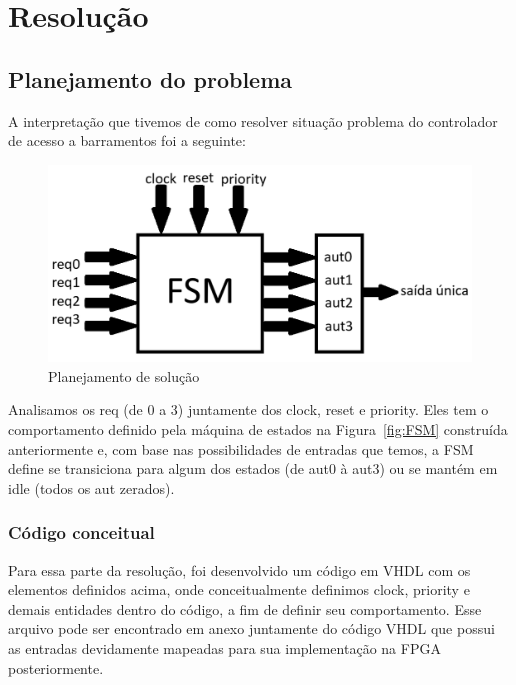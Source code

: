 \documentclass[oneside]{uffstex}
\begin{document}
\chapter{Resolução}
\section{Planejamento do problema}
A interpretação que tivemos de como resolver situação problema do controlador de acesso a barramentos foi a seguinte:
\begin{figure}[H]
    \centering
    \includegraphics[width=0.9\linewidth]{PLANNING.png}
    \caption{Planejamento de solução}
    \label{fig:planejamento}
\end{figure}
Analisamos os req (de 0 a 3) juntamente dos clock, reset e priority. Eles tem o comportamento definido pela máquina de estados na Figura~\ref{fig:FSM} construída anteriormente e, com base nas possibilidades de entradas que temos, a FSM define se transiciona para algum dos estados (de aut0 à aut3) ou se mantém em idle (todos os aut zerados).
\subsection{Código conceitual}
Para essa parte da resolução, foi desenvolvido um código em VHDL com os elementos definidos acima, onde conceitualmente definimos clock, priority e demais entidades dentro do código, a fim de definir seu comportamento. Esse arquivo pode ser encontrado em anexo juntamente do código VHDL que possui as entradas devidamente mapeadas para sua implementação na FPGA posteriormente.
\end{document}
